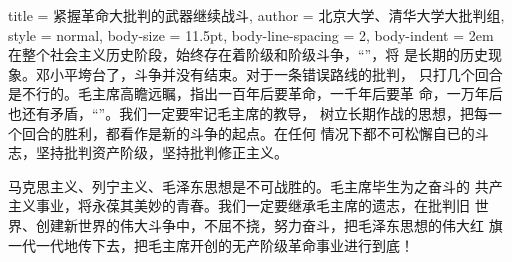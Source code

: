 \begin{hongqiarticle}{
        title  = {紧握革命大批判的武器继续战斗},
        author = {北京大学、清华大学大批判组},
        style  = normal,
        body-size = 11.5pt,
        body-line-spacing = 2,
        body-indent = 2em
    }
    在整个社会主义历史阶段，始终存在着阶级和阶级斗争，“”，将
    是长期的历史现象。邓小平垮台了，斗争并没有结束。对于一条错误路线的批判，
    只打几个回合是不行的。毛主席高瞻远瞩，指出一百年后要革命，一千年后要革
    命，一万年后也还有矛盾，“”。我们一定要牢记毛主席的教导，
    树立长期作战的思想，把每一个回合的胜利，都看作是新的斗争的起点。在任何
    情况下都不可松懈自已的斗志，坚持批判资产阶级，坚持批判修正主义。
    
    马克思主义、列宁主义、毛泽东思想是不可战胜的。毛主席毕生为之奋斗的
    共产主义事业，将永葆其美妙的青春。我们一定要继承毛主席的遗志，在批判旧
    世界、创建新世界的伟大斗争中，不屈不挠，努力奋斗，把毛泽东思想的伟大红
    旗一代一代地传下去，把毛主席开创的无产阶级革命事业进行到底！
\end{hongqiarticle}